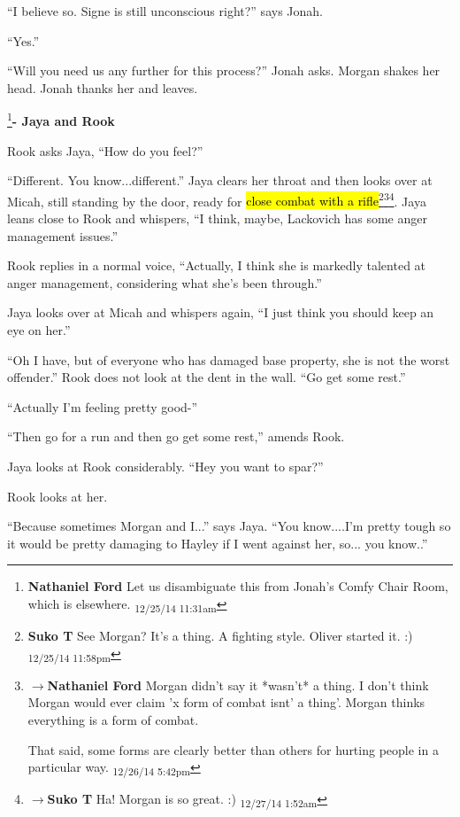 ``I believe so.  Signe is still unconscious right?'' says Jonah.

``Yes.''

``Will you need us any further for this process?'' Jonah asks.  Morgan shakes her head.  Jonah thanks her and leaves.




\footnote{\textbf{Nathaniel Ford }Let us disambiguate this from Jonah's Comfy Chair Room, which is elsewhere. \textsubscript{12/25/14 11:31am}}\textbf{- Jaya and Rook}

Rook asks Jaya, ``How do you feel?''

``Different.  You know...different.''  Jaya clears her throat and then looks over at Micah, still standing by the door, ready for \hl{close combat with a rifle}\footnote{\textbf{Suko T }See Morgan?  It's a thing.  A fighting style.  Oliver started it.  :) \textsubscript{12/25/14 11:58pm}}\footnote{$\rightarrow$\textbf{Nathaniel Ford }Morgan didn't say it *wasn't* a thing. I don't think Morgan would ever claim 'x form of combat isnt' a thing'. Morgan thinks everything is a form of combat. 

That said, some forms are clearly better than others for hurting people in a particular way. \textsubscript{12/26/14 5:42pm}}\footnote{$\rightarrow$\textbf{Suko T }Ha!  Morgan is so great.  :) \textsubscript{12/27/14 1:52am}}.  Jaya leans close to Rook and whispers, ``I think, maybe, Lackovich has some anger management issues.''

Rook replies in a normal voice, ``Actually, I think she is markedly talented at anger management, considering what she's been through.''

Jaya looks over at Micah and whispers again, ``I just think you should keep an eye on her.''

``Oh I have, but of everyone who has damaged base property, she is not the worst offender.'' Rook does not look at the dent in the wall. ``Go get some rest.''

``Actually I'm feeling pretty good-''

``Then go for a run and then go get some rest,'' amends Rook.

Jaya looks at Rook considerably.  ``Hey you want to spar?''

Rook looks at her.

``Because sometimes Morgan and I...'' says Jaya.  ``You know....I'm pretty tough so it would be pretty damaging to Hayley if I went against her, so... you know..''

